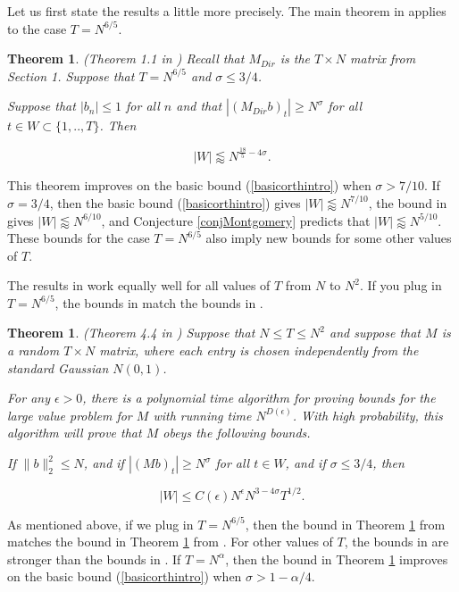 \documentclass{amsart}
\newtheorem{theorem}[prop]{Theorem}
\begin{document}
Let us first state the results a little more precisely.  The main theorem in \cite{GM} applies to the case $T = N^{6/5}$.  

\begin{theorem} \label{maingm} (Theorem 1.1 in \cite{GM}) Recall that $M_{Dir}$ is the $T \times N$ matrix from Section 1.  Suppose that $T = N^{6/5}$ and $\sigma \le 3/4$.

Suppose that $|b_n| \le 1$ for all $n$ and that $| (M_{Dir} b)_t | \ge N^\sigma$ for all $t \in W \subset \{ 1, .., T \}$.  Then

$$ |W| \lessapprox N^{\frac{18}{5} - 4 \sigma}. $$

\end{theorem}

This theorem improves on the basic bound (\ref{basicorthintro}) when $\sigma > 7/10$.  If $\sigma = 3/4$, then the basic bound (\ref{basicorthintro}) gives $|W| \lessapprox N^{7/10}$, the bound in \cite{GM} gives $|W| \lessapprox N^{6/10}$, and Conjecture \ref{conjMontgomery} predicts that $|W| \lessapprox N^{5/10}$.  These bounds for the case $T = N^{6/5} $ also imply new bounds for some other values of $T$.

The results in \cite{DHPT} work equally well for all values of $T$ from $N$ to $N^2$.  If you plug in $T = N^{6/5}$, the bounds in \cite{DHPT} match the bounds in \cite{GM}.

\begin{theorem} \label{maindhpt} (Theorem 4.4 in \cite{DHPT}) Suppose that $N \le T \le N^2$ and suppose that $M$ is a random $T \times N$ matrix, where each entry is chosen independently from the standard Gaussian $N(0,1)$.

For any $\epsilon > 0$, there is a polynomial time algorithm for proving bounds for the large value problem for $M$ with running time $N^{D(\epsilon)}$.  With high probability, this algorithm will prove that $M$ obeys the following bounds.

If $\| b \|_2^2 \le N$, and if $| (Mb)_t | \ge N^\sigma$ for all $t \in W$, and if $\sigma \le 3/4$, then 

$$ |W| \le C(\epsilon) N^\epsilon N^{3 - 4 \sigma} T^{1/2}. $$

\end{theorem}

As mentioned above, if we plug in $T = N^{6/5}$, then the bound in Theorem \ref{maindhpt} from \cite{DHPT} matches the bound in Theorem \ref{maingm} from \cite{GM}.  For other values of $T$, the bounds in \cite{DHPT} are stronger than the bounds in \cite{GM}.  If $T = N^\alpha$, then the bound in Theorem \ref{maindhpt} improves on the basic bound (\ref{basicorthintro}) when $\sigma > 1 - \alpha / 4$.  
\end{document}
